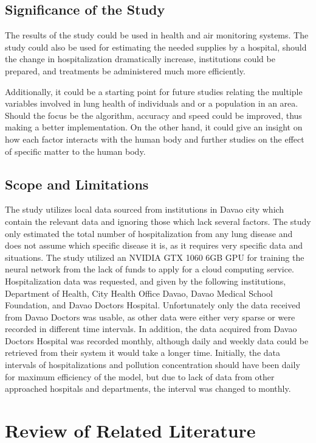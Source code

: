 ﻿\documentclass[10pt,11pt,12pt,oneside]{book}
\begin{document}
    \section{Significance of the Study}
    The results of the study could be used in health and air monitoring systems. The study could also be used for estimating the needed supplies by a hospital, should the change in hospitalization dramatically increase, institutions could be prepared, and treatments be administered much more efficiently.

    Additionally, it could be a starting point for future studies relating the multiple variables involved in lung health of individuals and or a population in an area. Should the focus be the algorithm, accuracy and speed could be improved, thus making a better implementation. On the other hand, it could give an insight on how each factor interacts with the human body and further studies on the effect of specific matter to the human body.
    \section{Scope and Limitations}
    The study utilizes local data sourced from institutions in Davao city which contain the relevant data and ignoring those which lack several factors. The study only estimated the total number of hospitalization from any lung disease and does not assume which specific disease it is, as it requires very specific data and situations. The study utilized an NVIDIA GTX 1060 6GB GPU for training the neural network from the lack of funds to apply for a cloud computing service.\\

    Hospitalization data was requested, and given by the following institutions, Department of Health, City Health Office Davao, Davao Medical School Foundation, and Davao Doctors Hospital. Unfortunately only the data received from Davao Doctors was usable, as other data were either very sparse or were recorded in different time intervals. In addition, the data acquired from Davao Doctors Hospital was recorded monthly, although daily and weekly data could be retrieved from
their system it would take a longer time. Initially, the data intervals of hospitalizations and pollution concentration should have been daily for maximum efficiency of the model, but due to lack of data from other approached hospitals and departments, the interval was changed to monthly.
\chapter{Review of Related Literature}
\end{document}
